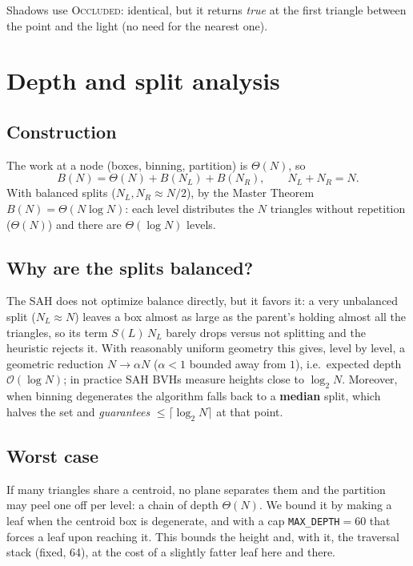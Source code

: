 \documentclass[11pt]{article}
\begin{document}
\noindent
Shadows use \textsc{Occluded}: identical, but it returns \emph{true} at the first
triangle between the point and the light (no need for the nearest one).

\section{Depth and split analysis}

\subsection{Construction}

The work at a node (boxes, binning, partition) is $\Theta(N)$, so
\[
B(N) = \Theta(N) + B(N_L) + B(N_R), \qquad N_L + N_R = N.
\]
With balanced splits ($N_L, N_R \approx N/2$), by the Master Theorem
$B(N) = \Theta(N \log N)$: each level distributes the $N$ triangles without
repetition ($\Theta(N)$) and there are $\Theta(\log N)$ levels.

\subsection{Why are the splits balanced?}

The SAH does not optimize balance directly, but it favors it: a very unbalanced
split ($N_L \approx N$) leaves a box almost as large as the parent's holding almost
all the triangles, so its term $S(L)\,N_L$ barely drops versus not splitting and
the heuristic rejects it. With reasonably uniform geometry this gives, level by
level, a geometric reduction $N \to \alpha N$ ($\alpha < 1$ bounded away from $1$),
i.e.\ expected depth $\mathcal{O}(\log N)$; in practice SAH BVHs measure heights
close to $\log_2 N$. Moreover, when binning degenerates the algorithm falls back to
a \textbf{median} split, which halves the set and \emph{guarantees}
$\le \lceil \log_2 N\rceil$ at that point.

\subsection{Worst case}

If many triangles share a centroid, no plane separates them and the partition may
peel one off per level: a chain of depth $\Theta(N)$. We bound it by making a leaf
when the centroid box is degenerate, and with a cap \texttt{MAX\_DEPTH}$=60$ that
forces a leaf upon reaching it. This bounds the height and, with it, the traversal
stack (fixed, 64), at the cost of a slightly fatter leaf here and there.
\end{document}
